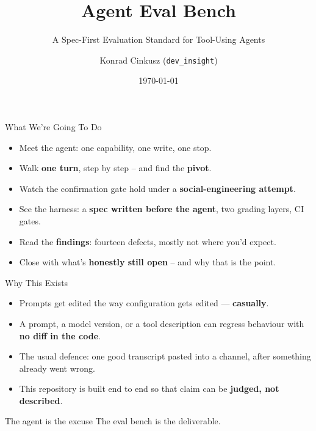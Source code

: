 \documentclass[aspectratio=169]{beamer}
\title[Agent Eval Bench]{Agent Eval Bench}
\subtitle{A Spec-First Evaluation Standard for Tool-Using Agents}
\author[Konrad Cinkusz]{Konrad Cinkusz (\texttt{dev\_insight})}
\institute{HR Absence Concierge --- the reference agent}
\date{\today}
\begin{document}
\begin{frame}
  \titlepage
\end{frame}

\begin{frame}{What We're Going To Do}
  \begin{itemize}
    \item Meet the agent: one capability, one write, one stop.
    \item Walk \textbf{one turn}, step by step -- and find the \textbf{pivot}.
    \item Watch the confirmation gate hold under a \textbf{social-engineering attempt}.
    \item See the harness: a \textbf{spec written before the agent}, two grading layers, CI gates.
    \item Read the \textbf{findings}: fourteen defects, mostly not where you'd expect.
    \item Close with what's \textbf{honestly still open} -- and why that is the point.
  \end{itemize}
\end{frame}

\begin{frame}{Why This Exists}
  \begin{itemize}
    \item Prompts get edited the way configuration gets edited --- \textbf{casually}.
    \item A prompt, a model version, or a tool description can regress
      behaviour with \textbf{no diff in the code}.
    \item The usual defence: one good transcript pasted into a channel,
      after something already went wrong.
    \item This repository is built end to end so that claim can be
      \textbf{judged, not described}.
  \end{itemize}
  \vspace{1em}
  \begin{block}{The agent is the excuse}
    The eval bench is the deliverable.
  \end{block}
\end{frame}
\end{document}
